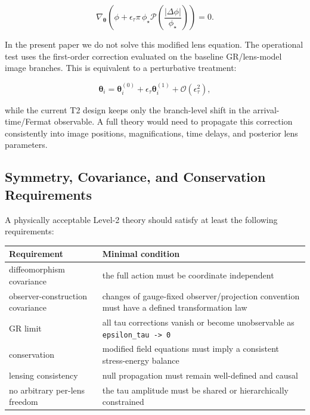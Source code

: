 \documentclass[11pt]{article}
\newcounter{none} %
\begin{document}
\[
\nabla_{\boldsymbol{\theta}}
\left(
\phi
+ \epsilon_\tau \pi\,\phi_\star
\mathcal{P}\!\left(\frac{|\Delta\phi|}{\phi_\star}\right)
\right)
=0.
\]

In the present paper we do not solve this modified lens equation. The
operational test uses the first-order correction evaluated on the
baseline GR/lens-model image branches. This is equivalent to a
perturbative treatment:

\[
\boldsymbol{\theta}_i
=
\boldsymbol{\theta}^{(0)}_i
+ \epsilon_\tau \boldsymbol{\theta}^{(1)}_i
+\mathcal{O}(\epsilon_\tau^2),
\]

while the current T2 design keeps only the branch-level shift in the
arrival-time/Fermat observable. A full theory would need to propagate
this correction consistently into image positions, magnifications, time
delays, and posterior lens parameters.

\subsection{Symmetry, Covariance, and Conservation
Requirements}\label{symmetry-covariance-and-conservation-requirements}

A physically acceptable Level-2 theory should satisfy at least the
following requirements:

{\def\LTcaptype{none} %
\begin{longtable}[]{@{}
  >{\raggedright\arraybackslash}p{}
  >{\raggedright\arraybackslash}p{}@{}}
\toprule\noalign{}
\begin{minipage}[b]{\linewidth}\raggedright
Requirement
\end{minipage} & \begin{minipage}[b]{\linewidth}\raggedright
Minimal condition
\end{minipage} \\
\midrule\noalign{}
\endhead
\bottomrule\noalign{}
\endlastfoot
diffeomorphism covariance & the full action must be coordinate
independent \\
observer-construction covariance & changes of gauge-fixed
observer/projection convention must have a defined transformation law \\
GR limit & all tau corrections vanish or become unobservable as
\texttt{epsilon\_tau\ -\textgreater{}\ 0} \\
conservation & modified field equations must imply a consistent
stress-energy balance \\
lensing consistency & null propagation must remain well-defined and
causal \\
no arbitrary per-lens freedom & the tau amplitude must be shared or
hierarchically constrained \\
\end{longtable}
}
\end{document}
